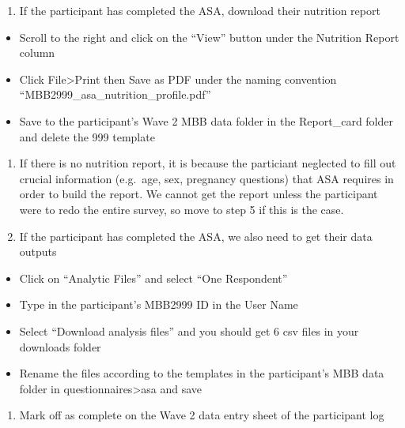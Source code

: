 \documentclass[
]{book}
\providecommand{\tightlist}{%
  \setlength{\itemsep}{0pt}\setlength{\parskip}{0pt}}
\begin{document}
\begin{enumerate}
\def\labelenumi{\arabic{enumi}.}
\setcounter{enumi}{2}
\tightlist
\item
  If the participant has completed the ASA, download their nutrition report
\end{enumerate}

\begin{itemize}
\tightlist
\item
  Scroll to the right and click on the ``View'' button under the Nutrition Report column
\item
  Click File\textgreater Print then Save as PDF under the naming convention ``MBB2999\_asa\_nutrition\_profile.pdf''
\item
  Save to the participant's Wave 2 MBB data folder in the Report\_card folder and delete the 999 template
\end{itemize}

\begin{enumerate}
\def\labelenumi{\arabic{enumi}.}
\setcounter{enumi}{3}
\tightlist
\item
  If there is no nutrition report, it is because the particiant neglected to fill out crucial information (e.g.~age, sex, pregnancy questions) that ASA requires in order to build the report. We cannot get the report unless the participant were to redo the entire survey, so move to step 5 if this is the case.
\item
  If the participant has completed the ASA, we also need to get their data outputs
\end{enumerate}

\begin{itemize}
\tightlist
\item
  Click on ``Analytic Files'' and select ``One Respondent''
\item
  Type in the participant's MBB2999 ID in the User Name
\item
  Select ``Download analysis files'' and you should get 6 csv files in your downloads folder
\item
  Rename the files according to the templates in the participant's MBB data folder in questionnaires\textgreater asa and save
\end{itemize}

\begin{enumerate}
\def\labelenumi{\arabic{enumi}.}
\setcounter{enumi}{5}
\tightlist
\item
  Mark off as complete on the Wave 2 data entry sheet of the participant log
\end{enumerate}
\end{document}
